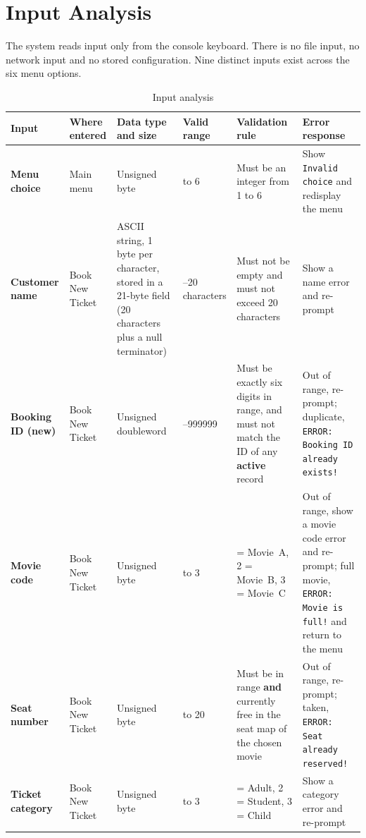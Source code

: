 \documentclass{thesis-library}
\newcommand{\tablefont}{\footnotesize\setstretch{1.15}\hyphenpenalty=10000\relax}
\begin{document}


\section{Input Analysis}

The system reads input only from the console keyboard. There is no file input, no network input and no stored configuration. Nine distinct inputs exist across the six menu options.

\begin{table}[H]
\centering
\tablefont
\caption{Input analysis}
\label{tab:input}
\begin{tabular}{|>{\raggedright\arraybackslash}p{1.9cm}|>{\raggedright\arraybackslash}p{1.4cm}|>{\raggedright\arraybackslash}p{2.4cm}|>{\raggedright\arraybackslash}p{1.5cm}|>{\raggedright\arraybackslash}p{2.7cm}|>{\raggedright\arraybackslash}p{3.45cm}|}
\hline
\textbf{Input} & \textbf{Where entered} & \textbf{Data type and size} & \textbf{Valid range} & \textbf{Validation rule} & \textbf{Error response} \\
\hline
\textbf{Menu choice} & Main menu & Unsigned byte & 1 to 6 & Must be an integer from 1 to 6 & Show \texttt{Invalid choice} and redisplay the menu \\
\hline
\textbf{Customer name} & Book New Ticket & ASCII string, 1 byte per character, stored in a 21-byte field (20 characters plus a null terminator) & 1--20 characters & Must not be empty and must not exceed 20 characters & Show a name error and re-prompt \\
\hline
\textbf{Booking ID (new)} & Book New Ticket & Unsigned doubleword & 100000--999999 & Must be exactly six digits in range, and must not match the ID of any \textbf{active} record & Out of range, re-prompt; duplicate, \texttt{ERROR: Booking ID already exists!} \\
\hline
\textbf{Movie code} & Book New Ticket & Unsigned byte & 1 to 3 & 1 = Movie~A, 2 = Movie~B, 3 = Movie~C & Out of range, show a movie code error and re-prompt; full movie, \texttt{ERROR: Movie is full!} and return to the menu \\
\hline
\textbf{Seat number} & Book New Ticket & Unsigned byte & 1 to 20 & Must be in range \textbf{and} currently free in the seat map of the chosen movie & Out of range, re-prompt; taken, \texttt{ERROR: Seat already reserved!} \\
\hline
\textbf{Ticket category} & Book New Ticket & Unsigned byte & 1 to 3 & 1 = Adult, 2 = Student, 3 = Child & Show a category error and re-prompt \\

\end{tabular}
\end{table}
\end{document}
